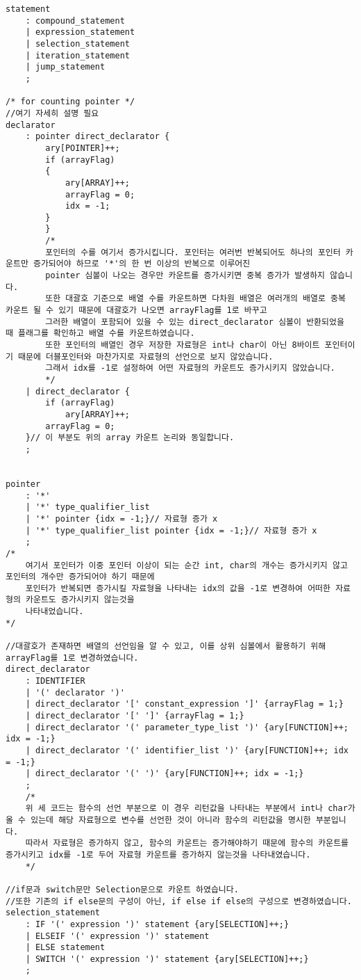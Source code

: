 \documentclass[11pt,oneside,a4paper]{article}
\begin{document}
\begin{verbatim}
statement
	: compound_statement
	| expression_statement
	| selection_statement
	| iteration_statement
	| jump_statement
	;

/* for counting pointer */
//여기 자세히 설명 필요
declarator
	: pointer direct_declarator {
		ary[POINTER]++;
		if (arrayFlag)
		{
			ary[ARRAY]++;
			arrayFlag = 0;
			idx = -1;
		}
		}
		/*
		포인터의 수를 여기서 증가시킵니다. 포인터는 여러번 반복되어도 하나의 포인터 카운트만 증가되어야 하므로 '*'의 한 번 이상의 반복으로 이루어진
		pointer 심볼이 나오는 경우만 카운트를 증가시키면 중복 증가가 발생하지 않습니다.
		또한 대괄호 기준으로 배열 수를 카운트하면 다차원 배열은 여러개의 배열로 중복 카운트 될 수 있기 때문에 대괄호가 나오면 arrayFlag를 1로 바꾸고
		그러한 배열이 포함되어 있을 수 있는 direct_declarator 심볼이 반환되었을 때 플래그를 확인하고 배열 수를 카운트하였습니다.
		또한 포인터의 배열인 경우 저장한 자료형은 int나 char이 아닌 8바이트 포인터이기 때문에 더블포인터와 마찬가지로 자료형의 선언으로 보지 않았습니다.
		그래서 idx를 -1로 설정하여 어떤 자료형의 카운트도 증가시키지 않았습니다. 
		*/
	| direct_declarator {
		if (arrayFlag)
			ary[ARRAY]++;
		arrayFlag = 0;
	}// 이 부분도 위의 array 카운트 논리와 동일합니다.
	;


pointer
	: '*'
	| '*' type_qualifier_list
	| '*' pointer {idx = -1;}// 자료형 증가 x
	| '*' type_qualifier_list pointer {idx = -1;}// 자료형 증가 x
	;
/*
	여기서 포인터가 이중 포인터 이상이 되는 순간 int, char의 개수는 증가시키지 않고 포인터의 개수만 증가되어야 하기 때문에
	포인터가 반복되면 증가시킬 자료형을 나타내는 idx의 값을 -1로 변경하여 어떠한 자료형의 카운트도 증가시키지 않는것을
	나타내었습니다.
*/

//대괄호가 존재하면 배열의 선언임을 알 수 있고, 이를 상위 심볼에서 활용하기 위해 arrayFlag를 1로 변경하였습니다.
direct_declarator
	: IDENTIFIER
	| '(' declarator ')'
	| direct_declarator '[' constant_expression ']' {arrayFlag = 1;} 
	| direct_declarator '[' ']' {arrayFlag = 1;}
	| direct_declarator '(' parameter_type_list ')' {ary[FUNCTION]++; idx = -1;} 
	| direct_declarator '(' identifier_list ')' {ary[FUNCTION]++; idx = -1;}
	| direct_declarator '(' ')' {ary[FUNCTION]++; idx = -1;}
	;
	/*
	위 세 코드는 함수의 선언 부분으로 이 경우 리턴값을 나타내는 부분에서 int나 char가 올 수 있는데 해당 자료형으로 변수를 선언한 것이 아니라 함수의 리턴값을 명시한 부분입니다.
	따라서 자료형은 증가하지 않고, 함수의 카운트는 증가해야하기 때문에 함수의 카운트를 증가시키고 idx를 -1로 두어 자료형 카운트를 증가하지 않는것을 나타내였습니다.
	*/

//if문과 switch문만 Selection문으로 카운트 하였습니다.
//또한 기존의 if else문의 구성이 아닌, if else if else의 구성으로 변경하였습니다.
selection_statement
	: IF '(' expression ')' statement {ary[SELECTION]++;}
	| ELSEIF '(' expression ')' statement
	| ELSE statement
	| SWITCH '(' expression ')' statement {ary[SELECTION]++;}
	;


\end{verbatim}
\end{document}
